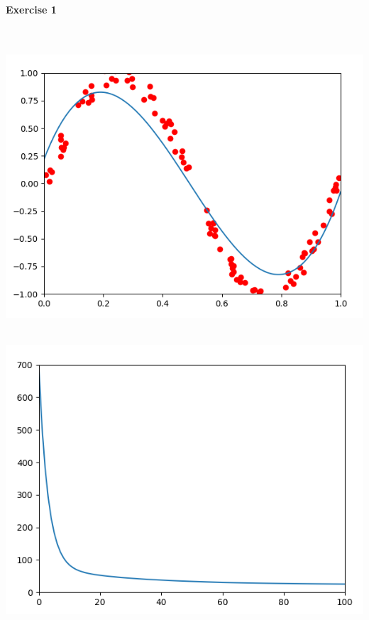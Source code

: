\documentclass[a4paper]{article}
\begin{document}
\vspace*{-3cm}
\centering
\begin{Large}
\textbf{Exercise 1}
\end{Large}

~\\~\\

\includegraphics[width=1\textwidth]{linear-regression.png}

~\\
\includegraphics[width=1\textwidth]{error.png}
\end{document}
